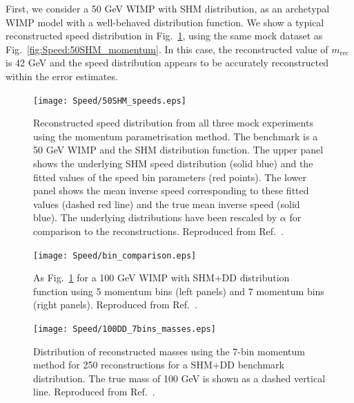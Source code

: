 First, we consider a 50 GeV WIMP with SHM distribution, as an archetypal WIMP model with a well-behaved distribution function. We show a typical reconstructed speed distribution in Fig.\ \ref{fig:Speed:SHM50}, using the same mock dataset as Fig.\ \ref{fig:Speed:50SHM_momentum}. In this case, the reconstructed value of \(m_\textrm{rec}\) is 42 GeV and the speed distribution appears to be accurately reconstructed within the error estimates.

 \begin{figure}[t]
\centering
\texttt{[image: Speed/50SHM\_speeds.eps]}
\caption[Reconstructed speed distribution from all three mock experiments using the momentum parametrisation method for a 50 GeV WIMP and SHM distribution function.]{Reconstructed speed distribution from all three mock experiments using the momentum parametrisation method. The benchmark is a 50 GeV WIMP and the SHM distribution function. The upper panel shows the underlying SHM speed distribution (solid blue) and the fitted values of the speed bin parameters (red points). The lower panel shows the mean inverse speed corresponding to these fitted values (dashed red line) and the true mean inverse speed (solid blue). The underlying distributions have been rescaled by \(\alpha\) for comparison to the reconstructions. Reproduced from Ref.~\cite{Kavanagh:2012}.}
  \label{fig:Speed:SHM50}
\end{figure}

 \begin{figure}[t]
\centering
  \texttt{[image: Speed/bin\_comparison.eps]}
\caption{As Fig.\ \ref{fig:Speed:SHM50} for a 100 GeV WIMP with SHM+DD distribution function using 5 momentum bins (left panels) and 7 momentum bins (right panels). Reproduced from Ref.~\cite{Kavanagh:2012}.}
  \label{fig:Speed:DD100}
\end{figure}

\begin{figure}[t]
\centering
\texttt{[image: Speed/100DD\_7bins\_masses.eps]}
\caption[Distribution of reconstructed masses using the 7-bin momentum method for a SHM+DD benchmark distribution.]{Distribution of reconstructed masses using the 7-bin momentum method for 250 reconstructions for a SHM+DD benchmark distribution. The true mass of 100 GeV is shown as a dashed vertical line. Reproduced from Ref.~\cite{Kavanagh:2012}.}
  \label{fig:Speed:7bins}
\end{figure}

